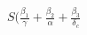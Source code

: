 \documentclass[preview]{standalone}
\begin{document}
\begin{center}
$S(\frac{\beta_1}{\gamma} + \frac{\beta_2}{\alpha} + \frac{\beta_3}{\delta_c}$
\end{center}
\end{document}
